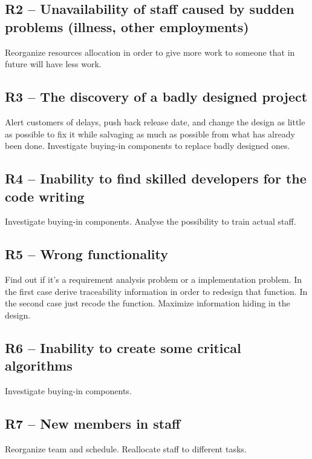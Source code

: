 \subsection{R2 -- Unavailability of staff caused by sudden problems (illness, other employments)}
Reorganize resources allocation in order to give more work to someone that in future will have less work.

\subsection{R3 -- The discovery of a badly designed project}
Alert customers of delays, push back release date, and change the design as little as possible to fix it while salvaging as much as possible from what has already been done. Investigate buying-in components to replace badly designed ones.

\subsection{R4 -- Inability to find skilled developers for the code writing}
Investigate buying-in components. Analyse the possibility to train actual staff.

\subsection{R5 -- Wrong functionality}
Find out if it’s a requirement analysis problem or a implementation problem. In the first case derive traceability information in order to redesign that function. In the second case just recode the function. Maximize information hiding in the design.

\subsection{R6 -- Inability to create some critical algorithms}
Investigate buying-in components.

\subsection{R7 -- New members in staff}
Reorganize team and schedule. Reallocate staff to different tasks.

